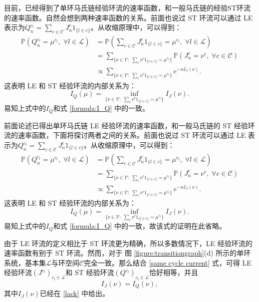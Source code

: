 目前，已经得到了单环马氏链经验环流的速率函数，和一般马氏链的经验ST环流的速率函数。自然会想到两种速率函数的关系。前面也说过 ST 环流可以通过 LE 表示为$Q_n^{c_l} = \sum_{c\in\mathcal{C}}J^c_n1_{\{l\in c\}}$。从收缩原理中，可以得到：
\begin{align*}
	\mathbb{P}\left(Q_n^{c_l}=\mu^{c_l},\;\forall l\in\mathcal{L}\right)
	&= \mathbb{P}\left(\sum_{c\in\mathcal{C}}J^c_n1_{\{l\in c\}}=\mu^{c_l},\;\forall l\in\mathcal{L}\right)\\
	&= \sum_{\{\nu\in\mathcal{V}:\;\sum_c\nu^c1_{\{l\in c\}}=\mu^{c_l}\}}
	\mathbb{P}\left(J^c_n=\nu^c,\;\forall c\in\mathcal{C}\right)\\
	&\propto \sum_{\{\nu\in\mathcal{V}:\;\sum_c\nu^c1_{\{l\in c\}}=\mu^{c_l}\}}e^{-nI_J(\nu)}.
\end{align*}
这表明 LE 和 ST 经验环流的内部关系为：
\begin{equation*}
	I_Q(\mu) = \inf_{\{\nu\in\mathcal{V}:\;\sum_c\nu^c1_{\{l\in c\}}=\mu^{c_l}\}}I_J(\nu).
\end{equation*}
易知上式中的$I_Q$和式 \eqref{formula:I_Q} 中的一致。

前面论述已得出单环马氏链 LE 经验环流的速率函数，和一般马氏链的 ST 经验环流的速率函数，下面将探讨两者之间的关系。前面也说过 ST 环流可以通过 LE 表示为$Q_n^{c_l} = \sum_{c\in\mathcal{C}}J^c_n1_{\{l\in c\}}$。从收缩原理中，可以得到：
\begin{align*}
	\mathbb{P}\left(Q_n^{c_l}=\mu^{c_l},\;\forall l\in\mathcal{L}\right)
	&= \mathbb{P}\left(\sum_{c\in\mathcal{C}}J^c_n1_{\{l\in c\}}=\mu^{c_l},\;\forall l\in\mathcal{L}\right)\\
	&= \sum_{\{\nu\in\mathcal{V}:\;\sum_c\nu^c1_{\{l\in c\}}=\mu^{c_l}\}}
	\mathbb{P}\left(J^c_n=\nu^c,\;\forall c\in\mathcal{C}\right)\\
	&\propto \sum_{\{\nu\in\mathcal{V}:\;\sum_c\nu^c1_{\{l\in c\}}=\mu^{c_l}\}}e^{-nI_J(\nu)}.
\end{align*}
这表明 LE 和 ST 经验环流的内部关系为：
\begin{equation*}
	I_Q(\mu) = \inf_{\{\nu\in\mathcal{V}:\;\sum_c\nu^c1_{\{l\in c\}}=\mu^{c_l}\}}I_J(\nu).
\end{equation*}
易知上式中的$I_Q$和式 \eqref{formula:I_Q} 中的一致，故该式的证明在此省略。

由于 LE 环流的定义相比于 ST 环流更为精确，所以多数情况下，LE 经验环流的速率函数有别于 ST 环流。然而，对于 图 \ref{figure:transitiongraph}(d) 所示的单环系统，基本集$\mathcal{L}$与环空间$\mathcal{C}$完全一致。那么结合 \eqref{same cycle current} 式，可得 LE 经验环流$(J^{c_l})_{c_l\in\mathcal{L}}$和 ST 经验环流$(Q^{c_l})_{c_l\in\mathcal{L}}$恰好相等，并且 
\begin{equation*}
	I_J(\nu) = I_Q(\nu),
\end{equation*}
其中$I_J(\nu)$已经在 \eqref{lack} 中给出。

